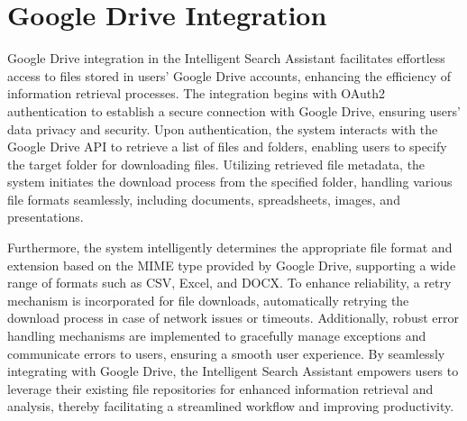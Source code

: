\documentclass[12pt,a4paper,oneside]{report}
\begin{document}






\newpage
\section{Google Drive Integration}
\par Google Drive integration in the Intelligent Search Assistant facilitates effortless access to files stored in users' Google Drive accounts, enhancing the efficiency of information retrieval processes. The integration begins with OAuth2 authentication to establish a secure connection with Google Drive, ensuring users' data privacy and security. Upon authentication, the system interacts with the Google Drive API to retrieve a list of files and folders, enabling users to specify the target folder for downloading files. Utilizing retrieved file metadata, the system initiates the download process from the specified folder, handling various file formats seamlessly, including documents, spreadsheets, images, and presentations.

Furthermore, the system intelligently determines the appropriate file format and extension based on the MIME type provided by Google Drive, supporting a wide range of formats such as CSV, Excel, and DOCX. To enhance reliability, a retry mechanism is incorporated for file downloads, automatically retrying the download process in case of network issues or timeouts. Additionally, robust error handling mechanisms are implemented to gracefully manage exceptions and communicate errors to users, ensuring a smooth user experience. By seamlessly integrating with Google Drive, the Intelligent Search Assistant empowers users to leverage their existing file repositories for enhanced information retrieval and analysis, thereby facilitating a streamlined workflow and improving productivity.
\hspace{10pt}
\end{document}
